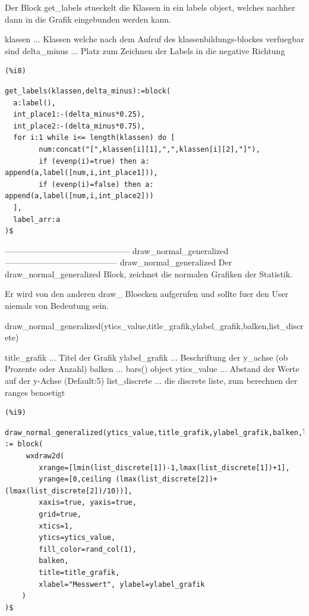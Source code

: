 \documentclass{article}
\begin{document}
Der Block get\_labels stueckelt die Klassen in ein labels object, welches nachher dann in die Grafik eingebunden werden kann.

    klassen ... Klassen welche nach dem Aufruf des klassenbildungs-blockes verfuegbar sind
    delta\_minus ... Platz zum Zeichnen der Labels in die negative Richtung

\noindent
\begin{minipage}[t]{8ex}{\color{red}\bf
\begin{verbatim}
(%i8) 
\end{verbatim}}
\end{minipage}
\begin{minipage}[t]{\textwidth}{\color{blue}
\begin{verbatim}
get_labels(klassen,delta_minus):=block(
  a:label(),
  int_place1:-(delta_minus*0.25),
  int_place2:-(delta_minus*0.75),
  for i:1 while i<= length(klassen) do [
        num:concat("[",klassen[i][1],",",klassen[i][2],"]"),
        if (evenp(i)=true) then a: append(a,label([num,i,int_place1])),
        if (evenp(i)=false) then a: append(a,label([num,i,int_place2]))
  ],
  label_arr:a
)$
\end{verbatim}}
\end{minipage}

--------------------------------------------- draw\_normal\_generalized -----------------------------------------
draw\_normal\_generalized
    Der draw\_normal\_generalized Block, zeichnet die normalen Grafiken der Statistik.

    Er wird von den anderen draw\_ Bloecken aufgerufen und sollte fuer den User niemals von Bedeutung sein.


draw\_normal\_generalized(ytics\_value,title\_grafik,ylabel\_grafik,balken,list\_discrete)

title\_grafik    ... Titel der Grafik
ylabel\_grafik   ... Beschriftung der y\_achse (ob Prozente oder Anzahl)
balken          ... bars() object
ytics\_value     ... Abstand der Werte auf der y-Achse (Default:5)
list\_discrete   ... die discrete liste, zum berechnen der ranges benoetigt 

\noindent
\begin{minipage}[t]{8ex}{\color{red}\bf
\begin{verbatim}
(%i9) 
\end{verbatim}}
\end{minipage}
\begin{minipage}[t]{\textwidth}{\color{blue}
\begin{verbatim}
draw_normal_generalized(ytics_value,title_grafik,ylabel_grafik,balken,list_discrete) := block(
     wxdraw2d(
        xrange=[lmin(list_discrete[1])-1,lmax(list_discrete[1])+1], 
        yrange=[0,ceiling (lmax(list_discrete[2])+(lmax(list_discrete[2])/10))],
        xaxis=true, yaxis=true,
        grid=true,
        xtics=1, 
        ytics=ytics_value,
        fill_color=rand_col(1),
        balken,
        title=title_grafik,
        xlabel="Messwert", ylabel=ylabel_grafik
    )
)$
\end{verbatim}}
\end{minipage}
\end{document}
